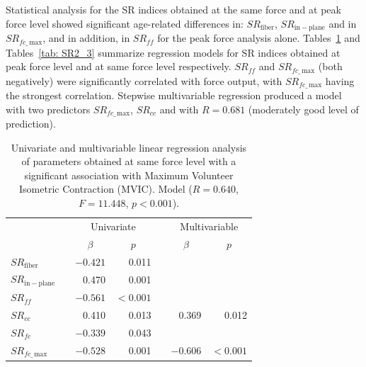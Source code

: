Statistical analysis for the SR indices obtained at the same force and at peak force level showed significant age-related differences in: $SR_{\mathrm{fiber}}$, $SR_{\mathrm{in-plane}}$ and in $SR_{fc\_\,\mathrm{max}}$, and in addition, in $SR_{ff}$ for the peak force analysis alone. 
Tables~\ref{tab: SR2_2} and Tables~\ref{tab: SR2_3} summarize regression models for SR indices obtained at peak force level and at same force level respectively.
$SR_{ff}$ and $SR_{fc\_\,\mathrm{max}}$ (both negatively) were significantly correlated with force output, with $SR_{fc\_\,\mathrm{max}}$ having the strongest correlation. 
Stepwise multivariable regression produced a model with two predictors $SR_{fc\_\,\mathrm{max}}$, $SR_{cc}$ and with $R=0.681$ (moderately good level of prediction).
\begin{table}[!htb]
\vspace{+0.2cm}
\caption[Univariate and multivariable linear regression analysis of parameters obtained at same force level with maximum volunteer isometric contraction]{Univariate and multivariable linear regression analysis of parameters obtained at same force level with a significant association with Maximum Volunteer Isometric Contraction (MVIC). Model ($R=0.640$, $F=11.448$, $p<0.001$).}
\label{tab: SR2_2}
\begin{center}
\begin{tabular}{@{}llrrrrr@{}}
\toprule[1pt]\midrule[0.3pt]
               && \multicolumn{2}{c}{Univariate} &  & \multicolumn{2}{c}{Multivariable} \\ \cmidrule(lr){3-4} \cmidrule(lr){6-7}
               && \multicolumn{1}{c}{$\beta$}     & \multicolumn{1}{c}{$p$}            &  & \multicolumn{1}{c}{$\beta$}       & \multicolumn{1}{c}{$p$}              \\ \midrule
$SR_{\mathrm{fiber}}$       & & $-0.421$   & 0.011              &  &            &                     \\ [2pt]
$SR_{\mathrm{in-plane}}$    & & 0.470    & 0.001              &  &            & 		                \\ [2pt]
$SR_{ff}$   				& & $-0.561$   & $<0.001$   &  &            &                     \\ [2pt]
$SR_{cc}$ 			   		& & 0.410    & 0.013				  &  & 	0.369	  &   0.012             \\ [2pt]
$SR_{fc}$  					& & $-0.339$   & 0.043              &  &            &                     \\ [2pt]
$SR_{fc\_\,\mathrm{max}}$   & & $-0.528$   & 0.001   			  &  &  $-0.606$    &   $<0.001$  \\ \midrule[0.3pt]\bottomrule[1pt]
\end{tabular}
\end{center}
\vspace{-0.2cm}
\end{table}
